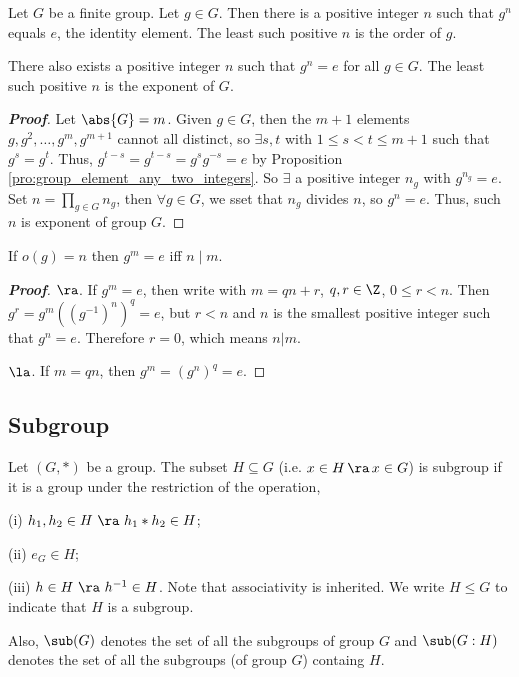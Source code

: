 \begin{proposition}\label{pro:element_order}
Let $G$ be a finite group. Let $g \in G$. Then there is a positive integer $n$ such that $g^n$ equals $e$, the identity element. The least such positive $n$ is the order of $g$.

There also exists a positive integer $n$ such that $g^n = e$ for all $g \in G$. The least such positive $n$ is the exponent of $G$.
\end{proposition}

\begin{proof}[\bf Proof]
Let $\abs{G} = m$. Given $g\in G$, then the $m+1$ elements $g,g^2,\dots, g^m,g^{m+1}$ cannot all distinct, so $\exists s,t$ with $1\leq s<t \leq m +1$ such that $g^s = g^t$. Thus, $g^{t-s} = g^{t-s} = g^{s}g^{-s} = e$ by Proposition \ref{pro:group_element_any_two_integers}. So $\exists$ a positive integer $n_g$ with $g^{n_g} = e$. Set $n = \prod_{g\in G}n_g$, then $\forall g\in G$, we sset that $n_g$ divides $n$, so $g^n = e$. Thus, such $n$ is exponent of group $G$.
\end{proof}



\begin{lemma}\label{lem:order_element}
If $o(g) = n$ then $g^m = e$ iff $n\mid m$.
\end{lemma}

\begin{proof}[\bf Proof]
$\ra$. If $g^m = e$, then write with $m = qn +r$, $q,r\in \Z$, $0\leq r<n$. Then $g^r = g^m((g^{-1})^n)^q =e$, but $r<n$ and $n$ is the smallest positive integer such that $g^n = e$. Therefore $r=0$, which means $n|m$.

$\la$. If $m=qn$, then $g^m = (g^n)^q = e$.
\end{proof}


\subsection{Subgroup}

\begin{definition}\label{def:subgroup}
Let $(G,*)$ be a group. The subset $H\subseteq G$ (i.e. $x\in H \ \! \ra \! \ x\in G$) is subgroup if it is a group under the restriction of the operation,
\ben
\item [(i)] $h_1,h_2 \in H\ \ra\ h_1 * h_2 \in H$;
\item [(ii)] $e_G \in H$;
\item [(iii)] $h\in H\ \ra\ h^{-1}\in H$.
\een
Note that associativity is inherited. We write $H\leq G$ to indicate that $H$ is a subgroup.

Also, $\sub(G)$ denotes the set of all the subgroups of group $G$ and $\sub(G:H)$ denotes the set of all the subgroups (of group $G$) containg $H$.
\end{definition}


